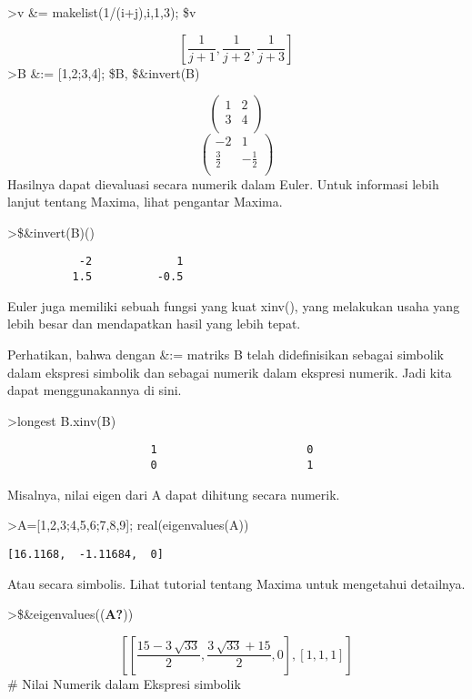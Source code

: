 \documentclass[
]{book}
\begin{document}
\textgreater v \&= makelist(1/(i+j),i,1,3); \$v

\[\left[ \frac{1}{j+1} , \frac{1}{j+2} , \frac{1}{j+3} \right] \]\textgreater B \&:= {[}1,2;3,4{]}; \$B, \$\&invert(B)

\[\begin{pmatrix}1 & 2 \\ 3 & 4 \\ \end{pmatrix}\]\[\begin{pmatrix}-2 & 1 \\ \frac{3}{2} & -\frac{1}{2} \\ 
 \end{pmatrix}\]Hasilnya dapat dievaluasi secara numerik dalam Euler. Untuk informasi lebih lanjut tentang Maxima, lihat pengantar Maxima.

\textgreater\$\&invert(B)()

\begin{verbatim}
           -2             1 
          1.5          -0.5 
\end{verbatim}

Euler juga memiliki sebuah fungsi yang kuat xinv(), yang melakukan usaha yang lebih besar dan mendapatkan hasil yang lebih tepat.

Perhatikan, bahwa dengan \&:= matriks B telah didefinisikan sebagai simbolik dalam ekspresi simbolik dan sebagai numerik dalam ekspresi numerik. Jadi kita dapat menggunakannya di sini.

\textgreater longest B.xinv(B)

\begin{verbatim}
                      1                       0 
                      0                       1 
\end{verbatim}

Misalnya, nilai eigen dari A dapat dihitung secara numerik.

\textgreater A={[}1,2,3;4,5,6;7,8,9{]}; real(eigenvalues(A))

\begin{verbatim}
[16.1168,  -1.11684,  0]
\end{verbatim}

Atau secara simbolis. Lihat tutorial tentang Maxima untuk mengetahui detailnya.

\textgreater\$\&eigenvalues((\textbf{A?}))

\[\left[ \left[ \frac{15-3\,\sqrt{33}}{2} , \frac{3\,\sqrt{33}+15}{2}
  , 0 \right]  , \left[ 1 , 1 , 1 \right]  \right] \]\# Nilai Numerik dalam Ekspresi simbolik
\end{document}
